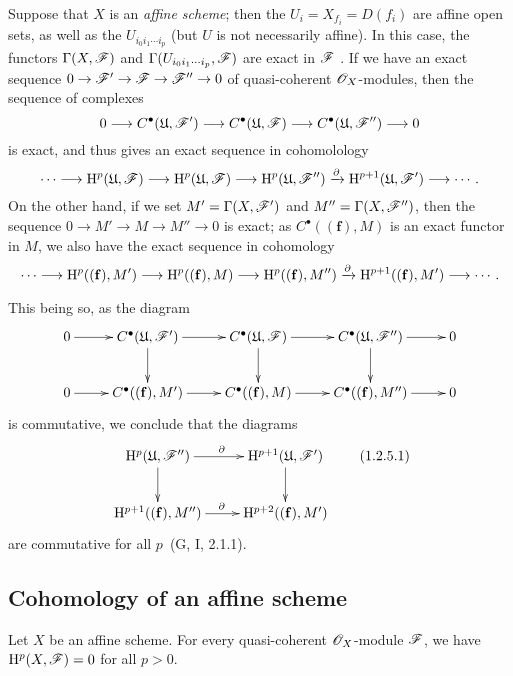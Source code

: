 \begin{remark}[1.2.5]
\label{III.1.2.5}
Suppose that $X$ is an \emph{affine scheme}; then the $U_i=X_{f_i}=D(f_i)$ are affine open sets, as well as the $U_{i_0 i_1\cdots i_p}$ (but $U$ is not necessarily affine).
In this case, the functors $\Gamma(X,\mathscr{F})$ and $\Gamma(U_{i_0 i_1\cdots i_p},\mathscr{F})$ are exact in $\mathscr{F}$ .
If we have an exact sequence $0\to\sh{F}'\to\sh{F}\to\sh{F}''\to 0$ of quasi-coherent $\mathscr{O}_X$-modules, then the sequence of complexes
\[
  0\to C^\bullet(\mathfrak{U},\sh{F}')\to C^\bullet(\mathfrak{U},\sh{F})\to C^\bullet(\mathfrak{U},\sh{F}'')\to 0
\]
is exact, and thus gives an exact sequence in cohomolology
\[
  \cdots\to\HH^p(\mathfrak{U},\sh{F})\to\HH^p(\mathfrak{U},\sh{F})\to\HH^p(\mathfrak{U},\sh{F}'')\xrightarrow{\partial}\HH^{p+1}(\mathfrak{U},\sh{F}')\to\cdots.
\]
On the other hand, if we set $M'=\Gamma(X,\mathscr{F}')$ and $M''=\Gamma(X,\mathscr{F}'')$, then the sequence $0\to M'\to M\to M''\to 0$ is exact; as $C^\bullet((\mathbf{f}),M)$ is an exact functor in $M$, we also have the exact sequence in cohomology
\[
  \cdots\to\HH^p((\mathbf{f}),M')\to\HH^p((\mathbf{f}),M)\to\HH^p((\mathbf{f}),M'')\xrightarrow{\partial}\HH^{p+1}((\mathbf{f}),M')\to\cdots.
\]

This being so, as the diagram
\[
  \xymatrix{
    0\ar[r] &
    C^\bullet(\mathfrak{U},\sh{F}')\ar[r]\ar[d] &
    C^\bullet(\mathfrak{U},\sh{F})\ar[r]\ar[d] &
    C^\bullet(\mathfrak{U},\sh{F}'')\ar[r]\ar[d] &
    0\\
    0\ar[r] &
    C^\bullet((\mathbf{f}),M')\ar[r] &
    C^\bullet((\mathbf{f}),M)\ar[r] &
    C^\bullet((\mathbf{f}),M'')\ar[r] &
    0
  }
\]
is commutative, we conclude that the diagrams
\[
  \xymatrix{
    \HH^p(\mathfrak{U},\sh{F}'')\ar[r]^\partial\ar[d] &
    \HH^{p+1}(\mathfrak{U},\sh{F}')\ar[d]\\
    \HH^{p+1}((\mathbf{f}),M'')\ar[r]^\partial &
    \HH^{p+2}((\mathbf{f}),M')
  }
  \tag{1.2.5.1}
\]
are commutative for all $p$~(G, I, 2.1.1).
\end{remark}

\subsection{Cohomology of an affine scheme}
\label{subsection:III.1.3}

\begin{theorem}[1.3.1]
\label{III.1.3.1}
Let $X$ be an affine scheme.
For every quasi-coherent $\mathscr{O}_X$-module $\mathscr{F}$, we have $\mathrm{H}^p(X,\mathscr{F})=0$ for all $p>0$.
\end{theorem}


